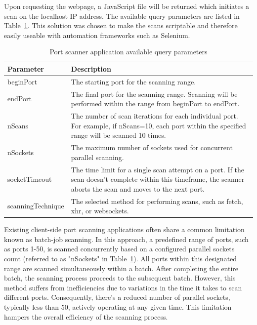Upon requesting the webpage, a JavaScript file will be returned which initiates a scan on the localhost IP address. The available query parameters are listed in Table~\ref{tab:port-scan-params}. This solution was chosen to make the scans scriptable and therefore easily useable with automation frameworks such as Selenium.

\begin{table}[htbp]
\footnotesize
\centering
\begin{tabular}{p{3cm} p{10cm}}
    \toprule
    Parameter & Description \\
    \midrule
    beginPort & The starting port for the scanning range. \\
    endPort & The final port for the scanning range. Scanning will be performed within the range from beginPort to endPort. \\
    nScans & The number of scan iterations for each individual port. For example, if nScans=10, each port within the specified range will be scanned 10 times. \\
    nSockets & The maximum number of sockets used for concurrent parallel scanning. \\
    socketTimeout & The time limit for a single scan attempt on a port. If the scan doesn't complete within this timeframe, the scanner aborts the scan and moves to the next port. \\
    scanningTechnique & The selected method for performing scans, such as fetch, xhr, or websockets. \\
    \bottomrule
\end{tabular}
\caption{Port scanner application available query parameters}
\label{tab:port-scan-params}
\end{table}

Existing client-side port scanning applications often share a common limitation known as batch-job scanning. In this approach, a predefined range of ports, such as ports 1-50, is scanned concurrently based on a configured parallel sockets count (referred to as "nSockets" in Table~\ref{tab:port-scan-params}). All ports within this designated range are scanned simultaneously within a batch. After completing the entire batch, the scanning process proceeds to the subsequent batch. However, this method suffers from inefficiencies due to variations in the time it takes to scan different ports. Consequently, there's a reduced number of parallel sockets, typically less than 50, actively operating at any given time. This limitation hampers the overall efficiency of the scanning process.

